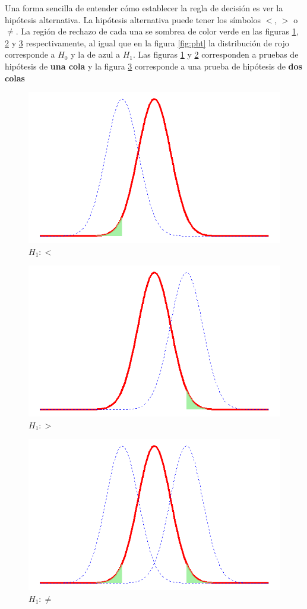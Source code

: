 \documentclass[]{book}
\begin{document}
Una forma sencilla de entender cómo establecer la regla de decisión es
ver la hipótesis alternativa. La hipótesis alternativa puede tener los
símbolos \(<\), \(>\) o \(\neq\). La región de rechazo de cada una se
sombrea de color verde en las figuras \ref{fig:phless}, \ref{fig:phmore}
y \ref{fig:ph2c} respectivamente, al igual que en la figura
\ref{fig:pht} la distribución de rojo corresponde a \(H_0\) y la de azul
a \(H_1\). Las figuras \ref{fig:phless} y \ref{fig:phmore} corresponden
a pruebas de hipótesis de \textbf{una cola} y la figura \ref{fig:ph2c}
corresponde a una prueba de hipótesis de \textbf{dos colas}

\begin{figure}[h]

{\centering \includegraphics[width=0.5\linewidth]{phless} 

}

\caption{$H_1:<$}\label{fig:phless}
\end{figure}

\begin{figure}[h]

{\centering \includegraphics[width=0.5\linewidth]{phmore} 

}

\caption{$H_1:>$}\label{fig:phmore}
\end{figure}

\begin{figure}[h]

{\centering \includegraphics[width=0.5\linewidth]{ph2c} 

}

\caption{$H_1:\neq$}\label{fig:ph2c}
\end{figure}
\end{document}
